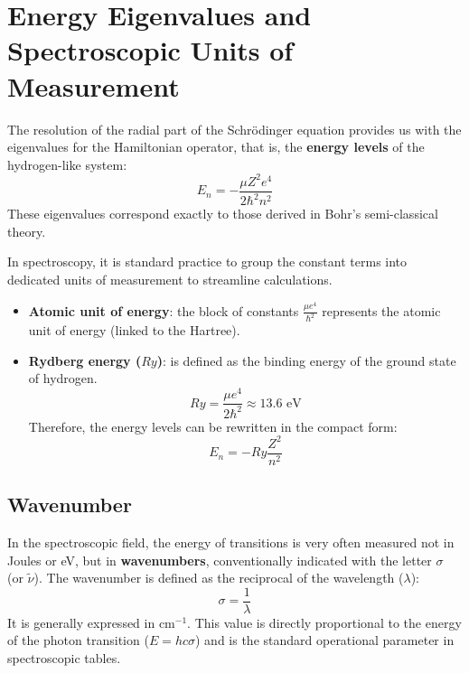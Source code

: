 \section{Energy Eigenvalues and Spectroscopic Units of Measurement}

The resolution of the radial part of the Schrödinger equation provides us with the eigenvalues for the Hamiltonian operator, that is, the \textbf{energy levels} of the hydrogen-like system:
\begin{equation}
E_n = - \frac{\mu Z^2 e^4}{2 \hbar^2 n^2}
\end{equation}
These eigenvalues correspond exactly to those derived in Bohr's semi-classical theory.

In spectroscopy, it is standard practice to group the constant terms into dedicated units of measurement to streamline calculations.
\begin{itemize}
\item \textbf{Atomic unit of energy}: the block of constants $\frac{\mu e^4}{\hbar^2}$ represents the atomic unit of energy (linked to the Hartree).
\item \textbf{Rydberg energy ($Ry$)}: is defined as the binding energy of the ground state of hydrogen.
\begin{equation}
Ry = \frac{\mu e^4}{2 \hbar^2} \approx 13.6 \text{ eV}
\end{equation}
Therefore, the energy levels can be rewritten in the compact form:
\begin{equation}
E_n = - Ry \frac{Z^2}{n^2}
\end{equation}
\end{itemize}

\subsection{Wavenumber}

In the spectroscopic field, the energy of transitions is very often measured not in Joules or eV, but in \textbf{wavenumbers}, conventionally indicated with the letter $\sigma$ (or $\tilde{\nu}$).
The wavenumber is defined as the reciprocal of the wavelength ($\lambda$):
\begin{equation}
\sigma = \frac{1}{\lambda}
\end{equation}
It is generally expressed in $\text{cm}^{-1}$. This value is directly proportional to the energy of the photon transition ($E = hc\sigma$) and is the standard operational parameter in spectroscopic tables.

